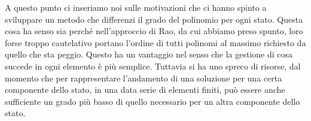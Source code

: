 A questo punto ci inseriamo noi sulle motivazioni che ci hanno spinto a sviluppare un metodo che differenzi il grado del polinomio per ogni stato. Questa cosa ha senso sia perché nell'approccio di Rao, da cui abbiamo preso spunto, loro forse troppo cautelativo portano l'ordine di tutti polinomi al massimo richiesto da quello che sta peggio. Questo ha un vantaggio nel senso che la gestione di cosa succede in ogni elemento è più semplice. Tuttavia si ha uno spreco di risorse, dal momento che per rappresentare l'andamento di una soluzione per una certa componente dello stato, in una data serie di elementi finiti, può essere anche sufficiente un grado più basso di quello necessario per un altra componente dello stato.

